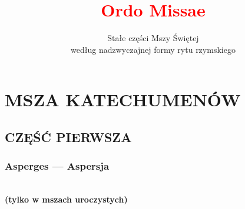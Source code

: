 \documentclass[12pt,titlepage]{book}
\title{\textcolor{red}{Ordo Missae}}
\author{Stałe części Mszy Świętej\\według nadzwyczajnej formy rytu rzymskiego }
\date{}
\newcommand{\negr}[1]{\textbf{\\#1}}
\begin{document}
	\maketitle
	\clearpage
	\tableofcontents
	\clearpage
	\null
	\cleardoublepage
	
	\chapter{MSZA KATECHUMENÓW}
	
	\section{CZĘŚĆ PIERWSZA}
	
	\subsection{Asperges --- Aspersja}
	\negr{(tylko w mszach uroczystych)}
	
\end{document}
